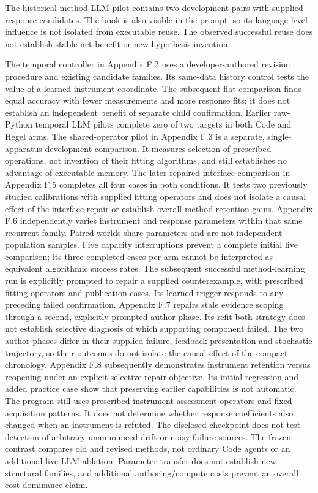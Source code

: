 \documentclass[twoside,11pt]{article}
\begin{document}
The historical-method LLM pilot contains two development pairs with supplied
response candidates. The book is also visible in the prompt, so its language-level
influence is not isolated from executable reuse. The observed successful reuse
does not establish stable net benefit or new hypothesis invention.


The temporal controller in Appendix F.2 uses a developer-authored revision
procedure and existing candidate families. Its same-data history control tests
the value of a learned instrument coordinate. The subsequent flat comparison
finds equal accuracy with fewer measurements and more response fits; it does
not establish an independent benefit of separate child confirmation.
Earlier raw-Python temporal LLM pilots complete zero of two targets in both Code
and Hegel arms. The shared-operator pilot in Appendix F.3 is a separate,
single-apparatus development comparison. It measures selection of prescribed
operations, not invention of their fitting algorithms, and still establishes
no advantage of executable memory. The later repaired-interface comparison in
Appendix F.5 completes all four cases in both conditions. It tests two previously
studied calibrations with supplied fitting operators and does not isolate a
causal effect of the interface repair or establish overall method-retention gains.
Appendix F.6 independently varies instrument and response parameters within that
same recurrent family. Paired worlds share parameters and are not independent
population samples. Five capacity interruptions prevent a complete initial live
comparison; its three completed cases per arm cannot be interpreted as equivalent
algorithmic success rates. The subsequent successful method-learning run is
explicitly prompted to repair a supplied counterexample, with prescribed fitting
operators and publication cases. Its learned trigger responds to any preceding
failed confirmation. Appendix F.7 repairs stale evidence scoping through a second,
explicitly prompted author phase. Its refit-both strategy does not establish
selective diagnosis of which supporting component failed. The two author phases
differ in their supplied failure, feedback presentation and stochastic trajectory,
so their outcomes do not isolate the causal effect of the compact chronology.
Appendix F.8 subsequently demonstrates instrument retention versus reopening
under an explicit selective-repair objective. Its initial regression and added
practice case show that preserving earlier capabilities is not automatic.
The program still uses prescribed instrument-assessment operators and fixed
acquisition patterns. It does not determine whether response coefficients also
changed when an instrument is refuted. The disclosed checkpoint does not test
detection of arbitrary unannounced drift or noisy failure sources.
The frozen contrast compares old and revised methods, not ordinary Code agents or
an additional live-LLM ablation. Parameter transfer does not establish new structural
families, and additional authoring/compute costs prevent an overall cost-dominance claim.
\end{document}
